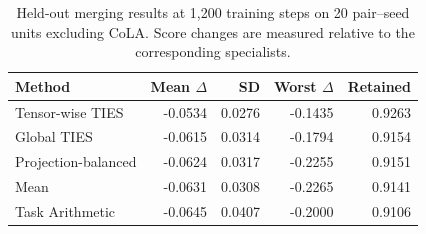 \begin{table}[t]
\centering
\caption{Held-out merging results at 1,200 training steps on 20 pair--seed units excluding CoLA. Score changes are measured relative to the corresponding specialists.}
\label{tab:main-results}
\begin{tabular}{lrrrr}
\hline
Method & Mean $\Delta$ & SD & Worst $\Delta$ & Retained \\
\hline
Tensor-wise TIES & -0.0534 & 0.0276 & -0.1435 & 0.9263 \\
Global TIES & -0.0615 & 0.0314 & -0.1794 & 0.9154 \\
Projection-balanced & -0.0624 & 0.0317 & -0.2255 & 0.9151 \\
Mean & -0.0631 & 0.0308 & -0.2265 & 0.9141 \\
Task Arithmetic & -0.0645 & 0.0407 & -0.2000 & 0.9106 \\
\hline
\end{tabular}
\end{table}
